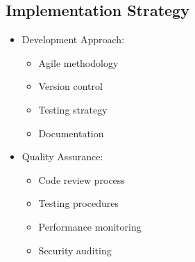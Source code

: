 \subsection{Implementation Strategy}
\begin{itemize}
    \item Development Approach:
    \begin{itemize}
        \item Agile methodology
        \item Version control
        \item Testing strategy
        \item Documentation
    \end{itemize}
    \item Quality Assurance:
    \begin{itemize}
        \item Code review process
        \item Testing procedures
        \item Performance monitoring
        \item Security auditing
    \end{itemize}
\end{itemize}

